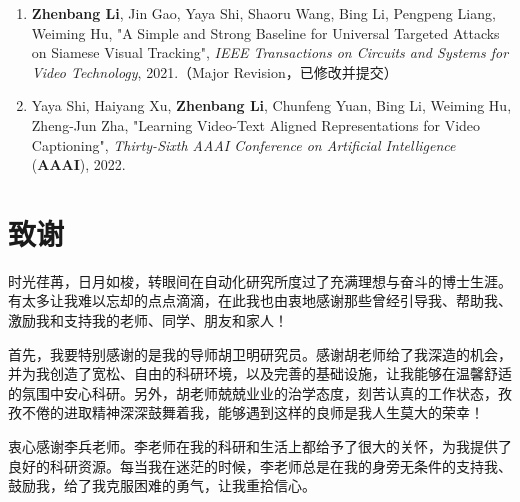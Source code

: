 {
\setlist[enumerate]{}%
\begin{enumerate}[nosep]
    \item \textbf{Zhenbang Li}, Jin Gao, Yaya Shi, Shaoru Wang, Bing Li, Pengpeng Liang, Weiming Hu, "A Simple and Strong Baseline for Universal Targeted Attacks on Siamese Visual Tracking", \textit{IEEE Transactions on Circuits and Systems for Video Technology}, 2021.（Major Revision，已修改并提交）
    \item Yaya Shi, Haiyang Xu, \textbf{Zhenbang Li}, Chunfeng Yuan, Bing Li, Weiming Hu, Zheng-Jun Zha, "Learning Video-Text Aligned Representations for Video Captioning", \textit{Thirty-Sixth AAAI Conference on Artificial Intelligence} (\textbf{AAAI}), 2022.
\end{enumerate}
}
\iffalse
\section*{申请或已获得的专利:}

(无专利时此项不必列出)

\section*{参加的研究项目及获奖情况:}

可以随意添加新的条目或是结构。
\fi
\chapter[致谢]{致\quad 谢}%
\thispagestyle{noheaderstyle}%

时光荏苒，日月如梭，转眼间在自动化研究所度过了充满理想与奋斗的博士生涯。有太多让我难以忘却的点点滴滴，在此我也由衷地感谢那些曾经引导我、帮助我、激励我和支持我的老师、同学、朋友和家人！

首先，我要特别感谢的是我的导师胡卫明研究员。感谢胡老师给了我深造的机会，并为我创造了宽松、自由的科研环境，以及完善的基础设施，让我能够在温馨舒适的氛围中安心科研。另外，胡老师兢兢业业的治学态度，刻苦认真的工作状态，孜孜不倦的进取精神深深鼓舞着我，能够遇到这样的良师是我人生莫大的荣幸！

衷心感谢李兵老师。李老师在我的科研和生活上都给予了很大的关怀，为我提供了良好的科研资源。每当我在迷茫的时候，李老师总是在我的身旁无条件的支持我、鼓励我，给了我克服困难的勇气，让我重拾信心。


